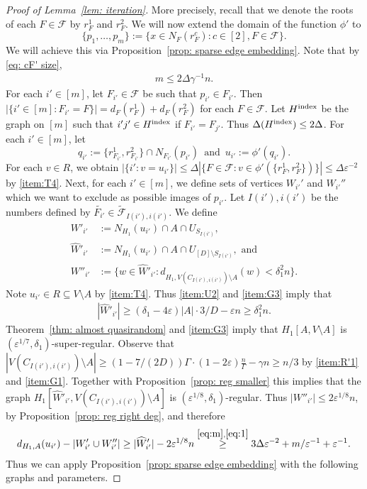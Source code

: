\documentclass[a4paper, 11pt, reqno]{amsart}
\numberwithin{equation}{section}
\newcommand{\1}{{\rm 1\hspace*{-0.4ex}%
\rule{0.1ex}{1.52ex}\hspace*{0.2ex}}}
\newcommand{\cF}{\mathcal{F}}
\newcommand{\I}{I}
\renewcommand{\epsilon}{\varepsilon}
\newcommand{\sm}{\setminus}
\begin{document}
\begin{proof}[Proof of Lemma~\ref{lem: iteration}]
More precisely,
recall that we denote the roots of each $F\in \cF$ by $r_F^1$ and $r_F^2$.
We will now extend the domain of the function $\phi'$
to 
$$\{p_1,\dots, p_m\}:=\{ x \in N_F(r^c_F): c\in [2], F\in \cF\}.$$
We will achieve this via Proposition~\ref{prop: sparse edge embedding}.
Note that by \eqref{eq: cF' size},
\begin{align}\label{eq:m}
	m\leq 2\Delta\gamma^{-1}n.
\end{align}
For each $i'\in [m]$, let $F_{i'}\in \cF$ be such that $p_{i'}\in F_{i'}$. 
Then $|\{i'\in [m]:F_{i'}=F\}|=d_{F}(r^1_F)+ d_{F}(r^2_F)$ for each $F\in \cF$.
Let $H^{\rm index}$ be the graph on $[m]$ such that $i'j' \in H^{\rm index}$ if $F_{i'}=F_{j'}$. 
Thus $\Delta(H^{\rm index})\leq 2\Delta$. 
For each $i'\in [m]$, let 
$$q_{i'}:= \{r^{1}_{F_{i'}}, r^{2}_{F_{i'}}\}\cap N_{F_{i'}}(p_{i'}) \enspace \text{and} \enspace u_{i'}:=\phi'(q_{i'}).$$ 
For each $v\in R$, we obtain $|\{i': v=u_{i'}\}|\leq \Delta |\{F\in \cF : v\in \phi'(\{r^1_F,r^2_F\}) \}|\leq \Delta \epsilon^{-2}$ by \ref{item:T4}.
Next, for each $i'\in[m]$, we define sets of vertices $W_{i'}'$ and $W_{i'}''$ which we want to exclude as possible images of $p_{i'}$.
Let ${\I}(i'), i(i')$ be the numbers defined by $\tilde{F_{i'}}\in \tilde{\cF}_{{\I}(i'),i(i')}$. 
We define
\begin{align*}
	W'_{i'}&:=N_{H_1}(u_{i'})\cap A \cap U_{S_{{\I}(i')}},\\
 \widehat{W}'_{i'}&:=N_{H_1}(u_{i'})\cap A \cap U_{[D]\setminus S_{{\I}(i')}}, \text{ and}\\
	W''_{i'}&:=\{ w \in \widehat{W}'_{i'}: d_{H_1,V(C_{{\I}(i'),i(i')})\sm A}(w)< \delta_1^2 n\}. 
\end{align*}
Note $u_{i'}\in R \subseteq V\setminus A$ by \ref{item:T4}. 
Thus \ref{item:U2} and \ref{item:G3} imply that
\begin{align}\label{eq:1}
	|\widehat{W}'_{i'}| \geq (\delta_1 -4\epsilon)|A| \cdot 3/D - \epsilon n \geq \delta_1^{2}n.
\end{align}
Theorem~\ref{thm: almost quasirandom} and \ref{item:G3} imply that
$H_1[A,V\setminus A]$ is $(\epsilon^{1/7},\delta_1)$-super-regular. 
Observe that $|V(C_{{\I(i')},i(i')})\setminus A|
\geq (1-7/(2D))\Gamma \cdot (1-2\epsilon) \frac{n}{\Gamma} -\gamma n
\geq n/3$ by \ref{item:R'1} and \ref{item:G1}. 
Together with Proposition~\ref{prop: reg smaller} this implies that the graph $H_1[\widehat{W}'_{i'},V(C_{I(i'),i(i')})\sm A]$ is $(\epsilon^{1/8},\delta_1)$-regular.
Thus $|W''_{i'}|\leq 2\epsilon^{1/8} n$, by Proposition~\ref{prop: reg right deg}, and therefore
\begin{align*}
d_{H_1,A}(u_{i'}) - |W'_{i'}\cup W''_{i'}| 
\geq |\widehat{W}'_{i'}|- 2\epsilon^{1/8}n 
\stackrel{\eqref{eq:m},\eqref{eq:1}}{\geq}  3\Delta\epsilon^{-2} + m/\epsilon^{-1} + \epsilon^{-1}.
\end{align*} 
Thus we can apply Proposition~\ref{prop: sparse edge embedding} with the following graphs and parameters. \newline
  

\end{proof}
\end{document}
